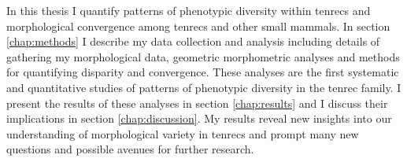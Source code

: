 	In this thesis I quantify patterns of phenotypic diversity within tenrecs and morphological convergence among tenrecs and other small mammals. In section \ref {chap:methods} I describe my data collection and analysis including details of gathering my morphological data, geometric morphometric analyses and methods for quantifying disparity and convergence. These analyses are the first systematic and quantitative studies of patterns of phenotypic diversity in the tenrec family.
	I present the results of these analyses in section \ref{chap:results} and I discuss their implications in section \ref{chap:discussion}.	
 	My results reveal new insights into our understanding of morphological variety in tenrecs and prompt many new questions and possible avenues for further research.


